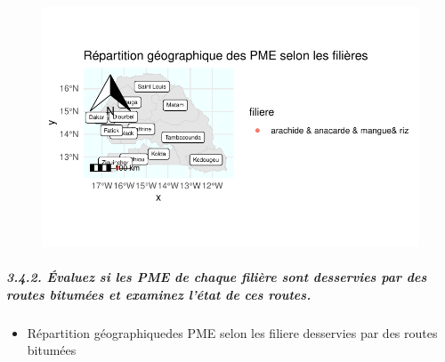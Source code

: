\documentclass[
  letterpaper,
  DIV=11,
  numbers=noendperiod]{scrartcl}
\let\oldsubparagraph\subparagraph
\renewcommand{\subparagraph}[1]{\oldsubparagraph{#1}\mbox{}}
\providecommand{\tightlist}{%
  \setlength{\itemsep}{0pt}\setlength{\parskip}{0pt}}\usepackage{longtable,booktabs,array}
\begin{document}
\begin{figure}[H]

{\centering \includegraphics{projet_R_files/figure-pdf/unnamed-chunk-45-1.pdf}

}

\end{figure}

\hypertarget{uxe9valuez-si-les-pme-de-chaque-filiuxe8re-sont-desservies-par-des-routes-bitumuxe9es-et-examinez-luxe9tat-de-ces-routes.}{%
\subparagraph{3.4.2. Évaluez si les PME de chaque filière sont
desservies par des routes bitumées et examinez l'état de ces
routes.}\label{uxe9valuez-si-les-pme-de-chaque-filiuxe8re-sont-desservies-par-des-routes-bitumuxe9es-et-examinez-luxe9tat-de-ces-routes.}}

\begin{itemize}
\tightlist
\item
  Répartition géographiquedes PME selon les filiere desservies par des
  routes bitumées
\end{itemize}
\end{document}
